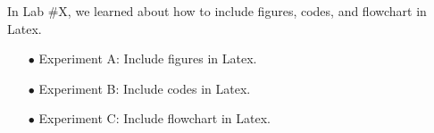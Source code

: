 \documentclass{LabReport}
\begin{document}
\makeCover

\setlength{\parskip}{0.2em} %
\fontsize{12}{1em} %
\setmainfont{Times New Roman} %
\justifying

\setlength{\parindent}{0em}
In Lab \#X, we learned about how to include figures, codes, and flowchart in Latex.
\setlength{\parindent}{1.5em}

\begin{itemize}[leftmargin=1em]
    \item [$\bullet$] Experiment A: Include figures in Latex.    
    \item [$\bullet$] Experiment B: Include codes in Latex.
    \item [$\bullet$] Experiment C: Include flowchart in Latex.
\end{itemize}





\end{document}
